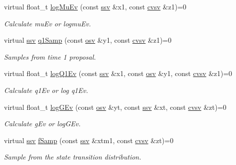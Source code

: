 \begin{DoxyCompactItemize}
virtual float\+\_\+t \hyperlink{classBSFilterWC_aa6cd7297e8e8d0beff66555e56d918d2}{log\+Mu\+Ev} (const \hyperlink{classBSFilterWC_afff292a8cc15505cc3aa244135203c78}{ssv} \&x1, const \hyperlink{classBSFilterWC_a52f5a46901a821fffe82937543220a1a}{cvsv} \&z1)=0
\begin{DoxyCompactList}\small\item\em Calculate mu\+Ev or logmu\+Ev. \end{DoxyCompactList}\item 
virtual \hyperlink{classBSFilterWC_afff292a8cc15505cc3aa244135203c78}{ssv} \hyperlink{classBSFilterWC_af6be8944fa674554f91e003b66f514ca}{q1\+Samp} (const \hyperlink{classBSFilterWC_a48b0c7f1a1cf7e57300cf820e74057ce}{osv} \&y1, const \hyperlink{classBSFilterWC_a52f5a46901a821fffe82937543220a1a}{cvsv} \&z1)=0
\begin{DoxyCompactList}\small\item\em Samples from time 1 proposal. \end{DoxyCompactList}\item 
virtual float\+\_\+t \hyperlink{classBSFilterWC_a7047659c85ddc9a9e798f8e66d5f0d2b}{log\+Q1\+Ev} (const \hyperlink{classBSFilterWC_afff292a8cc15505cc3aa244135203c78}{ssv} \&x1, const \hyperlink{classBSFilterWC_a48b0c7f1a1cf7e57300cf820e74057ce}{osv} \&y1, const \hyperlink{classBSFilterWC_a52f5a46901a821fffe82937543220a1a}{cvsv} \&z1)=0
\begin{DoxyCompactList}\small\item\em Calculate q1\+Ev or log q1\+Ev. \end{DoxyCompactList}\item 
virtual float\+\_\+t \hyperlink{classBSFilterWC_aa990c3307d1b3fd5fd980c5c770ec0be}{log\+G\+Ev} (const \hyperlink{classBSFilterWC_a48b0c7f1a1cf7e57300cf820e74057ce}{osv} \&yt, const \hyperlink{classBSFilterWC_afff292a8cc15505cc3aa244135203c78}{ssv} \&xt, const \hyperlink{classBSFilterWC_a52f5a46901a821fffe82937543220a1a}{cvsv} \&zt)=0
\begin{DoxyCompactList}\small\item\em Calculate g\+Ev or log\+G\+Ev. \end{DoxyCompactList}\item 
virtual \hyperlink{classBSFilterWC_afff292a8cc15505cc3aa244135203c78}{ssv} \hyperlink{classBSFilterWC_a8a503fa65fea50829b0223345d890a3e}{f\+Samp} (const \hyperlink{classBSFilterWC_afff292a8cc15505cc3aa244135203c78}{ssv} \&xtm1, const \hyperlink{classBSFilterWC_a52f5a46901a821fffe82937543220a1a}{cvsv} \&zt)=0
\begin{DoxyCompactList}\small\item\em Sample from the state transition distribution. \end{DoxyCompactList}\end{DoxyCompactItemize}
